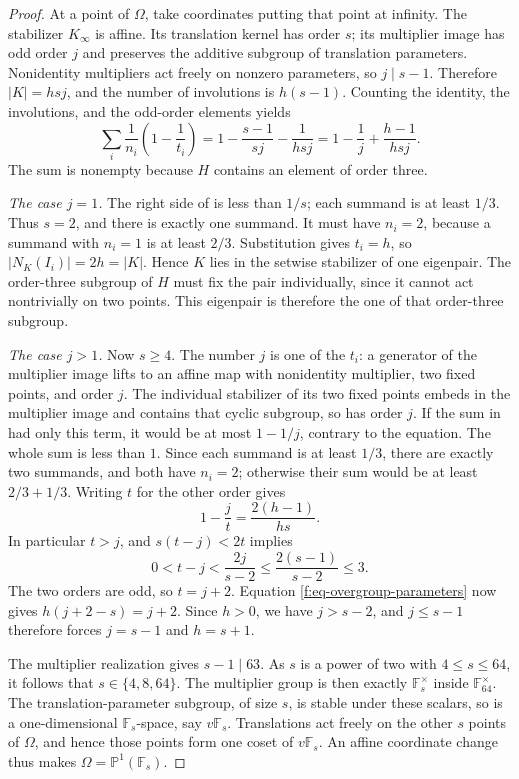 \begin{proof}
At a point of $\Omega$, take coordinates putting that point at infinity.
The stabilizer $K_\infty$ is affine. Its translation kernel has order $s$;
its multiplier image has odd order $j$ and preserves the additive subgroup
of translation parameters. Nonidentity multipliers act freely on nonzero
parameters, so $j\mid s-1$. Therefore $|K|=hsj$, and the number of involutions
is $h(s-1)$. Counting the identity, the involutions, and the odd-order
elements yields
\begin{equation}\label{f:eq-overgroup-count}
 \sum_i\frac1{n_i}\left(1-\frac1{t_i}\right)
 =1-\frac{s-1}{sj}-\frac1{hsj}
 =1-\frac1j+\frac{h-1}{hsj}.
\end{equation}
The sum is nonempty because $H$ contains an element of order three.

\emph{The case $j=1$.}
The right side of  is less than $1/s$; each
summand is at least $1/3$. Thus $s=2$, and there is exactly one summand. It
must have $n_i=2$, because a summand with $n_i=1$ is at least $2/3$.
Substitution gives $t_i=h$, so
$|N_K(I_i)|=2h=|K|$. Hence $K$ lies in the setwise stabilizer of one eigenpair.
The order-three subgroup of $H$ must fix the pair individually, since it
cannot act nontrivially on two points. This eigenpair is therefore the one
of that order-three subgroup.

\emph{The case $j>1$.}
Now $s\ge4$. The number $j$ is one of the $t_i$: a generator of the multiplier
image lifts to an affine map with nonidentity multiplier, two fixed points,
and order $j$. The individual stabilizer of its two fixed points embeds in
the multiplier image and contains that cyclic subgroup, so has order $j$.
If the sum in  had only this term, it would be at
most $1-1/j$, contrary to the equation. The whole sum is less than $1$.
Since each summand is at least $1/3$, there are exactly two summands, and
both have $n_i=2$; otherwise their sum would be at least $2/3+1/3$.
Writing $t$ for the other order gives
\begin{equation}\label{f:eq-overgroup-parameters}
 1-\frac jt=\frac{2(h-1)}{hs}.
\end{equation}
In particular $t>j$, and $s(t-j)<2t$ implies
\[
 0<t-j<\frac{2j}{s-2}\le\frac{2(s-1)}{s-2}\le3.
\]
The two orders are odd, so $t=j+2$. Equation
\eqref{f:eq-overgroup-parameters} now gives $h(j+2-s)=j+2$.
Since $h>0$, we have $j>s-2$, and $j\le s-1$ therefore forces
$j=s-1$ and $h=s+1$.

The multiplier realization gives $s-1\mid63$. As $s$ is a power of two with
$4\le s\le64$, it follows that $s\in\{4,8,64\}$. The multiplier group is
then exactly $\mathbb F_s^\times$ inside $\mathbb F_{64}^\times$. The
translation-parameter subgroup, of size $s$, is stable under these scalars,
so is a one-dimensional $\mathbb F_s$-space, say $v\mathbb F_s$. Translations
act freely on the other $s$ points of $\Omega$, and hence those points form
one coset of $v\mathbb F_s$. An affine coordinate change thus makes
$\Omega=\mathbb P^1(\mathbb F_s)$.


\end{proof}
